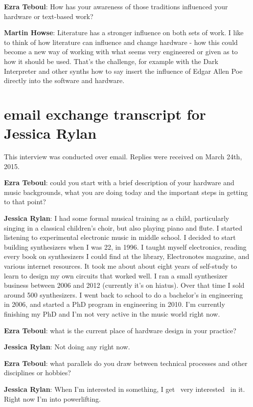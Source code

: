 \textbf{Ezra Teboul}: How has your awareness of those traditions influenced your
hardware or text-based work?

\textbf{Martin Howse}: Literature has a stronger influence on both sets of work. I like
to think of how literature can influence and change hardware - how this could become a
new way of working with what seems very engineered or given as to how it should be used.
That's the challenge, for example with the Dark Interpreter and other synths how to say
insert the influence of Edgar Allen Poe directly into the software and hardware.

\newpage

\clearpage 
\section{email exchange transcript for Jessica Rylan}
This interview was conducted over email. Replies were received on March 24th, 2015. 

\textbf{Ezra Teboul}: could you start with a brief description of your hardware and music backgrounds, what you are doing today and the important steps in getting to that point? 

\textbf{Jessica Rylan}: I had some formal musical training as a child, particularly singing in a classical children's choir, but also playing piano and flute. I started listening to experimental electronic music in middle school. I decided to start building synthesizers when I was 22, in 1996. I taught myself electronics, reading every book on synthesizers I could find at the library, Electronotes magazine, and various internet resources. It took me about about eight years of self-study to learn to design my own circuits that worked well. I ran a small synthesizer business between 2006 and 2012 (currently it's on hiatus). Over that time I sold around 500 synthesizers. I went back to school to do a bachelor's in engineering in 2006, and started a PhD program in engineering in 2010. I'm currently finishing my PhD and I'm not very active in the music world right now.

\textbf{Ezra Teboul}: what is the current place of hardware design in your practice? 

\textbf{Jessica Rylan}: Not doing any right now.

\textbf{Ezra Teboul}: what parallels do you draw between technical processes and other disciplines or hobbies? 

\textbf{Jessica Rylan}: When I'm interested in something, I get ~very interested~ in it. Right now I'm into powerlifting.

